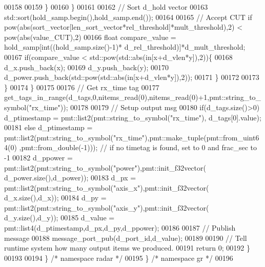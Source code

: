 \begin{DoxyCode}
00158                         
00159                     \}
00160                 \}
00161                 
00162                 \textcolor{comment}{// Sort d\_hold vector}
00163                 std::sort(hold\_samp.begin(),hold\_samp.end());
00164                 
00165                 \textcolor{comment}{// Accept CUT if pow(abs(sort\_vector[len\_sort\_vector*rel\_threshold]*mult\_threshold),2) <
       pow(abs(value\_CUT),2)}
00166                 \textcolor{keywordtype}{float} compare\_value = hold\_samp[int((hold\_samp.size()-1)*
      d_rel_threshold)]*d_mult_threshold;
00167                 \textcolor{keywordflow}{if}(compare\_value < std::pow(std::abs(in[x+d\_vlen*y]),2))\{
00168                     d_x.push\_back(x);
00169                     d_y.push\_back(y);
00170                     d_power.push\_back(std::pow(std::abs(in[x+d\_vlen*y]),2));
00171                 \}
00172                 
00173             \}
00174         \}
00175         
00176         \textcolor{comment}{// Get rx\_time tag}
00177         get\_tags\_in\_range(d_tags,0,nitems\_read(0),nitems\_read(0)+1,pmt::string\_to\_symbol(\textcolor{stringliteral}{"rx\_time"}));
00178         
00179         \textcolor{comment}{// Setup output msg}
00180         \textcolor{keywordflow}{if}(d_tags.size()>0) d_ptimestamp = pmt::list2(pmt::string\_to\_symbol(\textcolor{stringliteral}{"rx\_time"}),
      d_tags[0].value);
00181         \textcolor{keywordflow}{else} d_ptimestamp = pmt::list2(pmt::string\_to\_symbol(\textcolor{stringliteral}{"rx\_time"}),pmt::make\_tuple(pmt::from\_uint64(0)
      ,pmt::from\_double(-1))); \textcolor{comment}{// if no timetag is found, set to 0 and frac\_sec to -1}
00182         d_ppower = pmt::list2(pmt::string\_to\_symbol(\textcolor{stringliteral}{"power"}),pmt::init\_f32vector(
      d_power.size(),d_power));
00183         d_px = pmt::list2(pmt::string\_to\_symbol(\textcolor{stringliteral}{"axis\_x"}),pmt::init\_f32vector(
      d_x.size(),d_x));
00184         d_py = pmt::list2(pmt::string\_to\_symbol(\textcolor{stringliteral}{"axis\_y"}),pmt::init\_f32vector(
      d_y.size(),d_y));
00185         d_value = pmt::list4(d_ptimestamp,d_px,d_py,d_ppower);
00186         
00187         \textcolor{comment}{// Publish message}
00188         message\_port\_pub(d_port_id,d_value);
00189 
00190         \textcolor{comment}{// Tell runtime system how many output items we produced.}
00191         \textcolor{keywordflow}{return} 0;
00192     \}
00193 
00194   \} \textcolor{comment}{/* namespace radar */}
00195 \} \textcolor{comment}{/* namespace gr */}
00196 
\end{DoxyCode}
